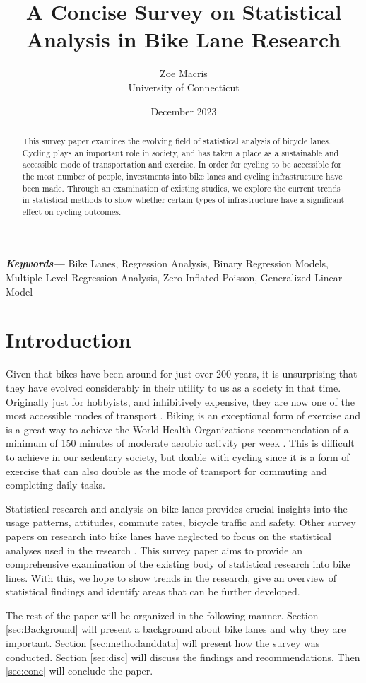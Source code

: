 \documentclass[12pt, letterpaper]{article}
\providecommand{\keywords}[1]
{
  \small	
  \textbf{\textit{Keywords---}} #1
}
\begin{document}
{\title{\bf A Concise Survey on Statistical Analysis in Bike Lane Research}
  \author{Zoe Macris\\
  University of Connecticut}
\date{December 2023}
  \maketitle} 

\begin{abstract}
This survey paper examines the evolving field of statistical analysis of bicycle lanes. Cycling plays an important role in society, and has taken a place as a sustainable and accessible mode of transportation and exercise. In order for cycling to be accessible for the most number of people, investments into bike lanes and cycling infrastructure have been made. Through an examination of existing studies, we explore the current trends in statistical methods to show whether certain types of infrastructure have a significant effect on cycling outcomes. 
\end{abstract}
\label{sec:abstract}

\keywords{Bike Lanes, Regression Analysis, Binary Regression Models, Multiple Level Regression Analysis, Zero-Inflated Poisson, Generalized Linear Model}


\section{Introduction}
\label{sec:intro}

Given that bikes have been around for just over 200 years, it is unsurprising that they have evolved considerably in their utility to us as a society in that time. Originally just for hobbyists, and inhibitively expensive, they are now one of the most accessible modes of transport \cite{BIKE2023}. Biking is an exceptional form of exercise and is a great way to achieve the World Health Organizations recommendation of a minimum of 150 minutes of moderate aerobic activity per week \citep{WHO2020}. This is difficult to achieve in our sedentary society, but doable with cycling since it is a form of exercise that can also double as the mode of transport for commuting and completing daily tasks. \par
Statistical research and analysis on bike lanes provides crucial insights into the usage patterns, attitudes, commute rates, bicycle traffic and safety. Other survey papers on research into bike lanes have neglected to focus on the statistical analyses used in the research \cite{7Mlenberg2019}. This survey paper aims to provide an comprehensive examination of the existing body of statistical research into bike lines. With this, we hope to show trends in the research, give an overview of statistical findings and identify areas that can be further developed. \par
The rest of the paper will be organized in the following manner. Section \ref{sec:Background} will present a background about bike lanes and why they are important. Section \ref{sec:methodanddata} will present how the survey was conducted. Section \ref{sec:disc} will discuss the findings and recommendations. Then \ref{sec:conc} will conclude the paper.
\end{document}
